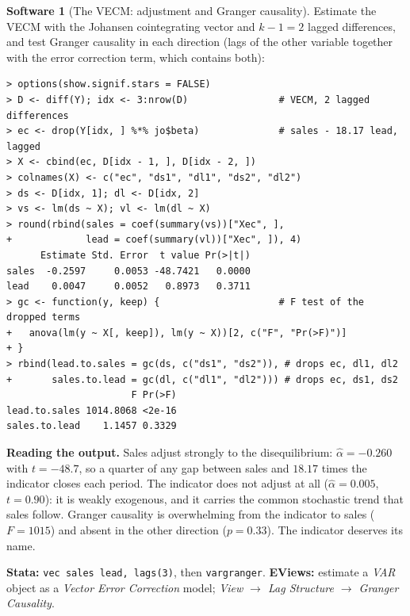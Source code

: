 \documentclass[11pt,a4paper]{article}
\numberwithin{equation}{section}
\theoremstyle{definition}
\newtheorem{software}[thm]{Software}
\begin{document}
\begin{software}[The VECM: adjustment and Granger causality]
\label{sw:vecm}
Estimate the VECM with the Johansen cointegrating vector and $k - 1 = 2$ lagged differences, and test Granger causality in each direction (lags of the other
variable together with the error correction term, which contains both):
{\small\begin{verbatim}
> options(show.signif.stars = FALSE)
> D <- diff(Y); idx <- 3:nrow(D)                # VECM, 2 lagged differences
> ec <- drop(Y[idx, ] %*% jo$beta)              # sales - 18.17 lead, lagged
> X <- cbind(ec, D[idx - 1, ], D[idx - 2, ])
> colnames(X) <- c("ec", "ds1", "dl1", "ds2", "dl2")
> ds <- D[idx, 1]; dl <- D[idx, 2]
> vs <- lm(ds ~ X); vl <- lm(dl ~ X)
> round(rbind(sales = coef(summary(vs))["Xec", ],
+             lead = coef(summary(vl))["Xec", ]), 4)
      Estimate Std. Error  t value Pr(>|t|)
sales  -0.2597     0.0053 -48.7421   0.0000
lead    0.0047     0.0052   0.8973   0.3711
> gc <- function(y, keep) {                     # F test of the dropped terms
+   anova(lm(y ~ X[, keep]), lm(y ~ X))[2, c("F", "Pr(>F)")]
+ }
> rbind(lead.to.sales = gc(ds, c("ds1", "ds2")), # drops ec, dl1, dl2
+       sales.to.lead = gc(dl, c("dl1", "dl2"))) # drops ec, ds1, ds2
                      F Pr(>F)
lead.to.sales 1014.8068 <2e-16
sales.to.lead    1.1457 0.3329
\end{verbatim}}
\textbf{Reading the output.} Sales adjust strongly to the disequilibrium: $\hat\alpha = -0.260$ with $t = -48.7$, so a quarter of any gap between sales and $18.17$ times the
indicator closes each period. The indicator does not adjust at all ($\hat\alpha = 0.005$, $t = 0.90$): it is weakly exogenous, and it carries the common stochastic
trend that sales follow. Granger causality is overwhelming from the indicator to sales ($F = 1015$) and absent in the other direction ($p = 0.33$). The
indicator deserves its name.

\textbf{Stata:} \texttt{vec sales lead, lags(3)}, then \texttt{vargranger}. \textbf{EViews:} estimate a \emph{VAR} object as a \emph{Vector Error Correction}
model; \emph{View $\to$ Lag Structure $\to$ Granger Causality}.
\end{software}
\end{document}
